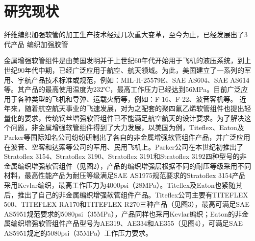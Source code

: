  	 	 
					
\section{研究现状}

纤维编织加强软管的加工生产技术经过几次重大变革，至今为止，已经发展出了3代产品
编织加强胶管

金属增强软管组件是由美国发明并于上世纪60年代开始用于飞机的液压系统，到上世纪90年代中期，已经广泛应用于航空、航天领域。为此，美国建立了一系列的军用、宇航产品技术标准或规范，例如：MIL-H-25579E、SAE AS604、SAE AS614等。其产品的最高使用温度为232℃，最高工作压力已经达到56MPa。目前广泛应用于各种类型的飞机和导弹、运载火箭等，例如：F-16、F-22、波音客机等。
近年来，随着航空航天事业的飞速发展，对为之配套的聚四氟乙烯软管组件也提出轻量化的要求，传统钢丝增强软管组件已不能满足航空航天的设计要求。为了解决这个问题，非金属增强软管组件得到了大力发展，以美国为例，Titeflex、Eaton及Parker等国际知名公司纷纷研制出了各自的非金属增强软管组件产品，并广泛应用在波音、空客和达索等公司的军用、民用飞机上。Parker公司在本世纪初推出了Stratoflex 3154、Stratoflex 3190、Stratoflex 3191和Stratoflex 3192四种型号的非金属编织增强软管组件（见图2），产品的编织增强层根据不同的耐压等级采用不同材料，最高性能产品为耐压等级满足SAE AS1975规范要求的Stratoflex 3154产品采用Kevlar编织，最高工作压力为4000psi（28MPa）。Titeflex及Eaton也紧随其后，推出了自己的非金属编织增强软管组件产品。Titeflex公司主要有TITEFLEX 500、TITEFLEX RA170和TITEFLEX R270三种产品（见图3），最高可满足SAE AS5951规范要求的5080psi（35MPa），产品同样也采用Kevlar编织；Eaton的非金属编织增强软管组件产品型号为AE319、AE334和AE355（见图4），可满足SAE AS5951规定的5080psi（35MPa）工作压力要求。



